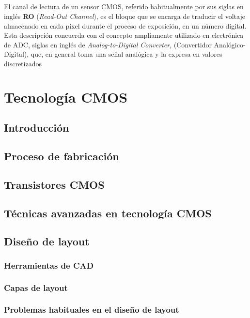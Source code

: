 \documentclass[12pt,a4paper,oneside,titlepage]{report}
\begin{document}
\paragraph{}
El canal de lectura de un sensor CMOS, referido habitualmente por sus
siglas en inglés \textbf{RO} (\textit{Read-Out Channel}), es el bloque que se
encarga de traducir el voltaje almacenado en cada pixel durante el proceso
de exposición, en un número digital. Esta descripción concuerda con el concepto
ampliamente utilizado en electrónica de ADC, siglas en inglés de \textit{Analog-to-Digital
Converter}, (Convertidor Analógico-Digital), que, en general toma una señal
analógica y la expresa en valores discretizados

\chapter{Tecnología CMOS}

\section{Introducción}

\section{Proceso de fabricación}

\section{Transistores CMOS}

\section{Técnicas avanzadas en tecnología CMOS}

\section{Diseño de layout}

\subsection{Herramientas de CAD}

\subsection{Capas de layout}

\subsection{Problemas habituales en el diseño de layout}
\end{document}
